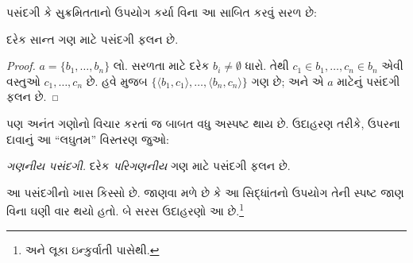\documentclass[../../../include/open-logic-section]{subfiles}
\begin{document}

પસંદગી કે સુક્રમિતતાનો ઉપયોગ કર્યા વિના
આ સાબિત કરવું સરળ છે:

\begin{lem}[$\Zminus$માં]
દરેક સાન્ત ગણ માટે પસંદગી ફલન છે.
\end{lem}

\begin{proof}
$a = \{b_1, \ldots, b_n\}$ લો. સરળતા માટે
દરેક $b_i \neq \emptyset$ ધારો. તેથી
$c_1 \in b_1, \ldots, c_n \in b_n$
એવી વસ્તુઓ $c_1, \ldots, c_n$ છે.
હવે 
મુજબ $\{\langle b_1,
c_1\rangle , \ldots, \langle b_n, c_n\rangle\}$
ગણ છે; અને એ $a$ માટેનું પસંદગી ફલન છે.
\end{proof}

પણ અનંત ગણોનો વિચાર કરતાં જ બાબત
વધુ અસ્પષ્ટ થાય છે. ઉદાહરણ તરીકે,
ઉપરના દાવાનું આ ``લઘુતમ'' વિસ્તરણ જુઓ:

\begin{defish}
\emph{ગણનીય પસંદગી.} દરેક \emph{પરિગણનીય}
ગણ માટે પસંદગી ફલન છે.
\end{defish}

આ પસંદગીનો ખાસ કિસ્સો છે. જાણવા મળે છે
કે આ સિદ્ધાંતનો ઉપયોગ તેની સ્પષ્ટ જાણ
વિના ઘણી વાર થયો હતો. બે સરસ ઉદાહરણો
આ છે.\footnote{\citet[\S9.4]{Potter2004}
અને લૂકા ઇન્કુર્વાતી પાસેથી.}
\end{document}
